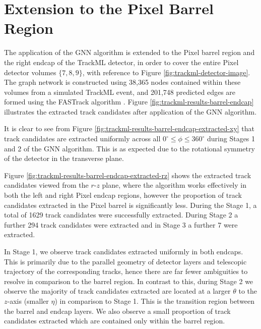 
\section{Extension to the Pixel Barrel Region}
\label{chapter-7-outlook}

The application of the GNN algorithm is extended to the Pixel barrel region and the right endcap of the TrackML detector, in order to cover the entire Pixel detector volumes $\{7, 8, 9\}$, with reference to Figure \ref{fig:trackml-detector-image}. The graph network is constructed using 38,365 nodes contained within these volumes from a simulated TrackML event, and 201,748 predicted edges are formed using the FASTrack algorithm \cite{Dmitry-fasttrack-addtest}. Figure \ref{fig:trackml-results-barrel-endcap} illustrates the extracted track candidates after application of the GNN algorithm. 

It is clear to see from Figure \ref{fig:trackml-results-barrel-endcap-extracted-xy} that track candidates are extracted uniformly across all $ 0^{\circ} \leq \phi \leq 360^{\circ}$ during Stages 1 and 2 of the GNN algorithm. This is as expected due to the rotational symmetry of the detector in the transverse plane. 

Figure \ref{fig:trackml-results-barrel-endcap-extracted-rz} shows the extracted track candidates viewed from the $r$-$z$ plane, where the algorithm works effectively in both the left and right Pixel endcap regions, however the proportion of track candidates extracted in the Pixel barrel is significantly less. During the Stage 1, a total of 1629 track candidates were successfully extracted. During Stage 2 a further 294 track candidates were extracted and in Stage 3 a further 7 were extracted.

In Stage 1, we observe track candidates extracted uniformly in both endcaps. This is primarily due to the parallel geometry of detector layers and telescopic trajectory of the corresponding tracks, hence there are far fewer ambiguities to resolve in comparison to the barrel region. In contrast to this, during Stage 2 we observe the majority of track candidates extracted are located at a larger $\theta$ to the $z$-axis (smaller $\eta$) in comparison to Stage 1. This is the transition region between the barrel and endcap layers. We also observe a small proportion of track candidates extracted which are contained only within the barrel region.


